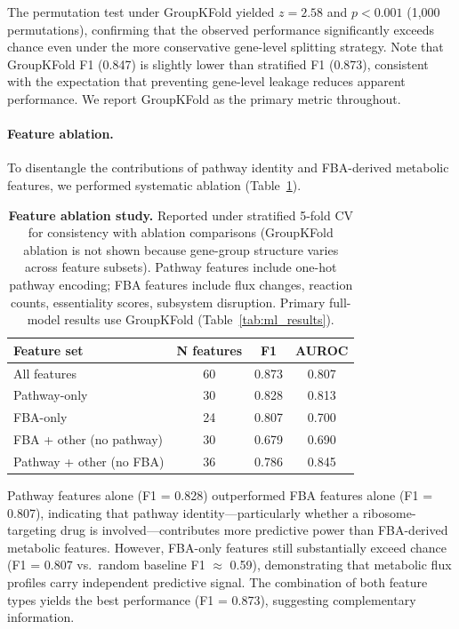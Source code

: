 \documentclass[12pt,a4paper]{article}
\begin{document}
The permutation test under GroupKFold yielded $z = 2.58$ and $p < 0.001$ (1,000 permutations), confirming that the observed performance significantly exceeds chance even under the more conservative gene-level splitting strategy. Note that GroupKFold F1 (0.847) is slightly lower than stratified F1 (0.873), consistent with the expectation that preventing gene-level leakage reduces apparent performance. We report GroupKFold as the primary metric throughout.

\paragraph{Feature ablation.} To disentangle the contributions of pathway identity and FBA-derived metabolic features, we performed systematic ablation (Table~\ref{tab:ablation}).

\begin{table}[t]
\centering
\caption{\textbf{Feature ablation study.} Reported under stratified 5-fold CV for consistency with ablation comparisons (GroupKFold ablation is not shown because gene-group structure varies across feature subsets). Pathway features include one-hot pathway encoding; FBA features include flux changes, reaction counts, essentiality scores, subsystem disruption. Primary full-model results use GroupKFold (Table~\ref{tab:ml_results}).}
\label{tab:ablation}
\begin{tabular}{lccc}
\toprule
\textbf{Feature set} & \textbf{N features} & \textbf{F1} & \textbf{AUROC} \\
\midrule
All features & 60 & 0.873 & 0.807 \\
Pathway-only & 30 & 0.828 & 0.813 \\
FBA-only & 24 & 0.807 & 0.700 \\
FBA + other (no pathway) & 30 & 0.679 & 0.690 \\
Pathway + other (no FBA) & 36 & 0.786 & 0.845 \\
\bottomrule
\end{tabular}
\end{table}

Pathway features alone (F1 = 0.828) outperformed FBA features alone (F1 = 0.807), indicating that pathway identity---particularly whether a ribosome-targeting drug is involved---contributes more predictive power than FBA-derived metabolic features. However, FBA-only features still substantially exceed chance (F1 = 0.807 vs.\ random baseline F1 $\approx$ 0.59), demonstrating that metabolic flux profiles carry independent predictive signal. The combination of both feature types yields the best performance (F1 = 0.873), suggesting complementary information.
\end{document}

